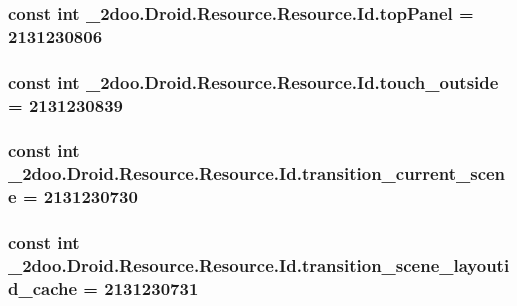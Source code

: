 \hypertarget{class__2doo_1_1_droid_1_1_resource_1_1_id_f12045134432943c3e1fff0a5426a0be}{
\subsubsection[{topPanel}]{\setlength{\rightskip}{0pt plus 5cm}const int \_\-2doo.Droid.Resource.Resource.Id.topPanel = 2131230806}}
\label{class__2doo_1_1_droid_1_1_resource_1_1_id_f12045134432943c3e1fff0a5426a0be}


\hypertarget{class__2doo_1_1_droid_1_1_resource_1_1_id_b6063d316b0986f72969a06b3c86d96a}{
\subsubsection[{touch\_\-outside}]{\setlength{\rightskip}{0pt plus 5cm}const int \_\-2doo.Droid.Resource.Resource.Id.touch\_\-outside = 2131230839}}
\label{class__2doo_1_1_droid_1_1_resource_1_1_id_b6063d316b0986f72969a06b3c86d96a}


\hypertarget{class__2doo_1_1_droid_1_1_resource_1_1_id_a61dd7c41cb201881ab77205d3c863ec}{
\subsubsection[{transition\_\-current\_\-scene}]{\setlength{\rightskip}{0pt plus 5cm}const int \_\-2doo.Droid.Resource.Resource.Id.transition\_\-current\_\-scene = 2131230730}}
\label{class__2doo_1_1_droid_1_1_resource_1_1_id_a61dd7c41cb201881ab77205d3c863ec}


\hypertarget{class__2doo_1_1_droid_1_1_resource_1_1_id_c5b8be6fd52b26dbd08c84b67f38a7ab}{
\subsubsection[{transition\_\-scene\_\-layoutid\_\-cache}]{\setlength{\rightskip}{0pt plus 5cm}const int \_\-2doo.Droid.Resource.Resource.Id.transition\_\-scene\_\-layoutid\_\-cache = 2131230731}}
\label{class__2doo_1_1_droid_1_1_resource_1_1_id_c5b8be6fd52b26dbd08c84b67f38a7ab}


